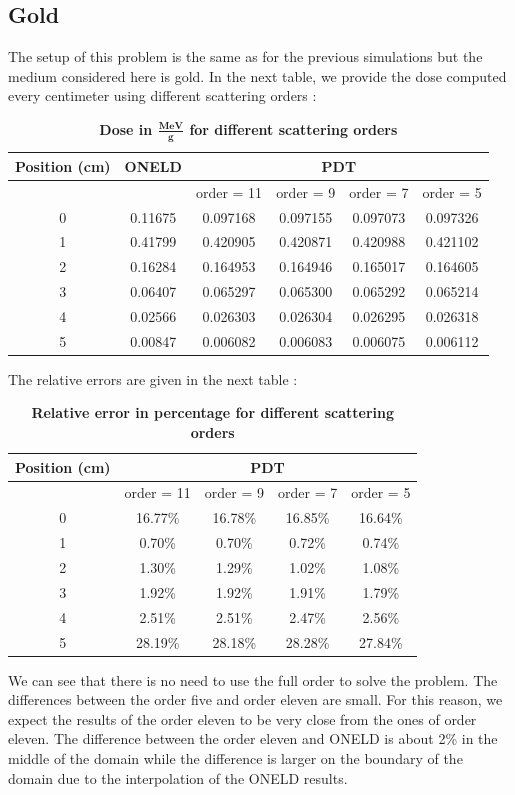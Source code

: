 \subsection{Gold}
The setup of this problem is the same as for the previous simulations but the
medium considered here is gold. In the next table, we provide the dose
computed every centimeter using different scattering orders :
\begin{table}[H]
\begin{center}
\caption{\bf{Dose in $\frac{\mathbf{MeV}}{\mathbf{g}}$ for different scattering orders}}
\begin{tabular}{|c|c|c|c|c|c|}
\hline
Position (cm) & ONELD & \multicolumn{4}{c|}{PDT} \\
\hline
 &  &  order = 11 & order = 9 & order = 7 & order = 5 \\
\hline
0 & 0.11675 & 0.097168 & 0.097155 & 0.097073 & 0.097326 \\
1 & 0.41799 & 0.420905 & 0.420871 & 0.420988 & 0.421102 \\
2 & 0.16284 & 0.164953 & 0.164946 & 0.165017 & 0.164605 \\
3 & 0.06407 & 0.065297 & 0.065300 & 0.065292 & 0.065214 \\
4 & 0.02566 & 0.026303 & 0.026304 & 0.026295 & 0.026318 \\
5 & 0.00847 & 0.006082 & 0.006083 & 0.006075 & 0.006112 \\
\hline
\end{tabular}
\end{center}
\end{table}                
The relative errors are given in the next table :
\begin{table}[H]
\begin{center}
\caption{\bf{Relative error in percentage for different scattering orders}}
\begin{tabular}{|c|c|c|c|c|}
\hline
Position (cm) & \multicolumn{4}{c|}{PDT}\\
\hline
 & order = 11 & order = 9 & order = 7 & order = 5 \\
\hline
0 & 16.77\% & 16.78\% & 16.85\% & 16.64\% \\
1 & 0.70\% & 0.70\% & 0.72\% & 0.74\% \\
2 & 1.30\% & 1.29\% & 1.02\% & 1.08\% \\
3 & 1.92\% & 1.92\% & 1.91\% & 1.79\% \\
4 & 2.51\% & 2.51\% & 2.47\% & 2.56\% \\
5 & 28.19\% & 28.18\% & 28.28\% & 27.84\% \\
\hline
\end{tabular}
\end{center}
\end{table}     
We can see that there is no need to use the full order to solve the problem.
The differences between the order five and order eleven are small. For this reason,
we expect the results of the order eleven to be very close from the ones of
order eleven. The difference between the order eleven and ONELD
is about 2\% in the middle of the domain while the difference is larger on the
boundary of the domain due to the interpolation of the ONELD results.

